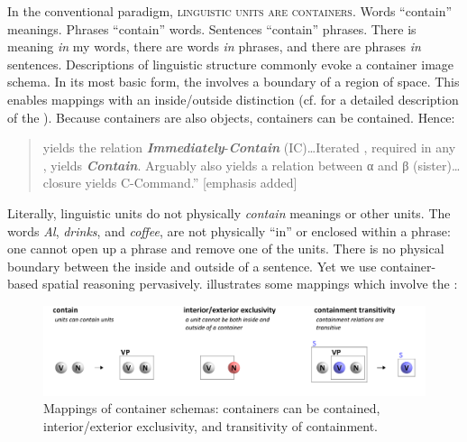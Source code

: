 In the conventional paradigm, \textsc{linguistic units are containers}. Words “contain” meanings. Phrases “contain” words. Sentences “contain” phrases. There is meaning \textit{in} my words, there are words \textit{in} phrases, and there are phrases \textit{in} sentences. Descriptions of linguistic structure commonly evoke a container image schema. In its most basic form, the  involves a boundary of a region of space. This enables mappings with an inside/outside distinction (cf. \citet{LakoffNúñez2000} for a detailed description of the ). Because containers are also objects, containers can be contained. Hence:

\begin{quote}
     yields the relation \textbf{\textit{Immediately}}{}-\textbf{\textit{Contain}} (IC)…Iterated , required in any , yields \textbf{\textit{Contain}}. Arguably  also yields a relation between α and β (sister)…  closure yields C-Command.” \citep[3]{Chomsky2001b} [emphasis added]
\end{quote}

  Literally, linguistic units do not physically \textit{contain} meanings or other units. The words \textit{Al}, \textit{drinks}, and \textit{coffee}, are not physically “in” or enclosed within a phrase: one cannot open up a phrase and remove one of the units. There is no physical boundary between the inside and outside of a sentence. Yet we use container-based spatial reasoning pervasively. {} illustrates some mappings which involve the :

  
\begin{figure}
\includegraphics[width=\textwidth]{figures/Tilsen-img32.png}
\caption{Mappings of container schemas: containers can be contained, interior/exterior exclusivity, and transitivity of containment.}
\label{fig:3:4}
\end{figure}
 

